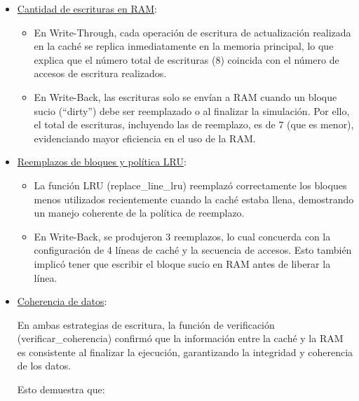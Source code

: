 \documentclass{article}
\begin{document}
\begin{itemize}

    \item  {\underline{Cantidad de escrituras en RAM}:}

    \begin{itemize}
        \item En Write-Through, cada operación de escritura de actualización realizada en la caché se replica inmediatamente en la memoria principal, lo que explica que el número total de escrituras (8) coincida con el número de accesos de escritura realizados.
        \item En Write-Back, las escrituras solo se envían a RAM cuando un bloque sucio (“dirty”) debe ser reemplazado o al finalizar la simulación. Por ello, el total de escrituras, incluyendo las de reemplazo, es de 7 (que es menor), evidenciando mayor eficiencia en el uso de la RAM.
    \end{itemize}

    \quad

    \item  {\underline{Reemplazos de bloques y política LRU}:}

    \begin{itemize}
        \item La función LRU  (replace\_line\_lru) reemplazó correctamente los bloques menos utilizados recientemente cuando la caché estaba llena, demostrando un manejo coherente de la política de reemplazo.
        \item En Write-Back, se produjeron 3 reemplazos, lo cual concuerda con la configuración de 4 líneas de caché y la secuencia de accesos. Esto también implicó tener que escribir el bloque sucio en RAM antes de liberar la línea.
    \end{itemize}

    \quad

    \item  {\underline{Coherencia de datos}:}
    
    \quad

    \begin{itemize}
        {En ambas estrategias de escritura, la función de verificación (verificar\_coherencia) confirmó que la información entre la caché y la RAM es consistente al finalizar la ejecución, garantizando la integridad y coherencia de los datos.}

        \quad

        Esto demuestra que:
        

\end{itemize}
\end{itemize}
\end{document}
